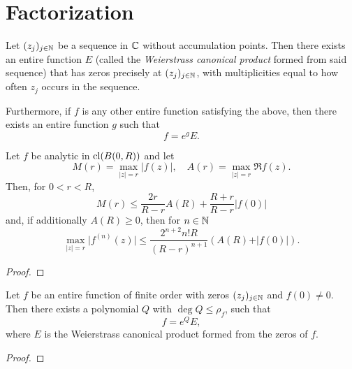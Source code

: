 \chapter{Factorization}
\label{ch:factorization}



\begin{theorem} [Weierstrass] \label{thm:weierstrass}
    Let $(z_j)_{j \in \mathbb{N}}$ be a sequence in $\mathbb{C}$ without accumulation points. Then there exists an entire function $E$ (called the \emph{Weierstrass canonical product} formed from said sequence) that has zeros precisely at $(z_j)_{j \in \mathbb{N}}$, with multiplicities equal to how often $z_j$ occurs in the sequence.

    Furthermore, if $f$ is any other entire function satisfying the above, then there exists an entire function $g$ such that
    $$ f = e^g E. $$
\end{theorem}


\begin{lemma} \label{lem:borel-caratheodory}
    Let $f$ be analytic in $\operatorname{cl}(B(0, R))$ and let
    $$ M(r) = \max_{\vert z \vert = r} \vert f(z) \vert, \quad A(r) = \max_{\vert z \vert = r} \Re f(z). $$
    Then, for $0 < r < R$,
    $$ M(r) \leq \frac{2r}{R - r} A(R) + \frac{R + r}{R - r} \vert f(0) \vert $$
    and, if additionally $A(R) \geq 0$, then for $n \in \mathbb{N}$
    $$ \max_{\vert z \vert = r} \vert f^{(n)}(z) \vert \leq \frac{2^{n+2} n! R}{(R - r)^{n+1}} (A(R) + \vert f(0) \vert). $$
\end{lemma}

\begin{proof}
\end{proof}

\begin{theorem}[Hadamard] \label{thm:hadamard}
    Let $f$ be an entire function of finite order with zeros $(z_j)_{j \in \mathbb{N}}$ and $f(0) \neq 0$. Then there exists a polynomial $Q$ with $\deg Q \leq \rho_f$, such that
    $$ f = e^Q E, $$
    where $E$ is the Weierstrass canonical product formed from the zeros of $f$.
\end{theorem}

\begin{proof}
\end{proof}